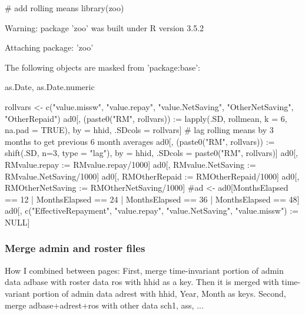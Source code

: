 \begin{Schunk}
\begin{Sinput}
# add rolling means
library(zoo)
\end{Sinput}
\begin{Soutput}
Warning: package 'zoo' was built under R version 3.5.2
\end{Soutput}
\begin{Soutput}

Attaching package: 'zoo'
\end{Soutput}
\begin{Soutput}
The following objects are masked from 'package:base':

    as.Date, as.Date.numeric
\end{Soutput}
\begin{Sinput}
rollvars <- c("value.missw", "value.repay", "value.NetSaving", "OtherNetSaving", "OtherRepaid")
ad0[, (paste0("RM", rollvars)) := lapply(.SD, rollmean, k = 6, na.pad = TRUE), 
   by = hhid, .SDcols = rollvars]
  # lag rolling means by 3 months to get previous 6 month averages	
ad0[, (paste0("RM", rollvars)) := shift(.SD, n=3, type = "lag"), 
   by = hhid, .SDcols = paste0("RM", rollvars)]
ad0[, RMvalue.repay := RMvalue.repay/1000]
ad0[, RMvalue.NetSaving := RMvalue.NetSaving/1000]
ad0[, RMOtherRepaid := RMOtherRepaid/1000]
ad0[, RMOtherNetSaving := RMOtherNetSaving/1000]
#ad <- ad0[MonthsElapsed == 12 | MonthsElapsed == 24 | MonthsElapsed == 36 | MonthsElapsed == 48]
ad0[, c("EffectiveRepayment", "value.repay", "value.NetSaving", "value.missw") := NULL] 
\end{Sinput}
\end{Schunk}

\subsubsection{Merge admin and roster files}

How I combined between pages: First, merge time-invariant portion of admin data \textsf{adbase} with roster data \textsf{ros} with \textsf{hhid} as a key. Then it is merged with time-variant portion of admin data \textsf{adrest} with \textsf{hhid, Year, Month} as keys. %
Second, merge \textsf{adbase+adrest+ros} with other data \textsf{sch1}, \textsf{ass}, ... 

